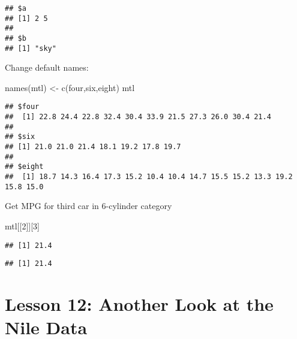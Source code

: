 \documentclass[
]{article}
\newenvironment{Shaded}{\begin{snugshade}}{\end{snugshade}}
\newcommand{\DecValTok}[1]{\textcolor[rgb]{0.00,0.00,0.81}{#1}}
\newcommand{\FunctionTok}[1]{\textcolor[rgb]{0.00,0.00,0.00}{#1}}
\newcommand{\NormalTok}[1]{#1}
\newcommand{\OtherTok}[1]{\textcolor[rgb]{0.56,0.35,0.01}{#1}}
\newcommand{\SpecialCharTok}[1]{\textcolor[rgb]{0.00,0.00,0.00}{#1}}
\newcommand{\StringTok}[1]{\textcolor[rgb]{0.31,0.60,0.02}{#1}}
\begin{document}
\begin{verbatim}
## $a
## [1] 2 5
## 
## $b
## [1] "sky"
\end{verbatim}

Change default names:

\begin{Shaded}
\begin{Highlighting}[]
\FunctionTok{names}\NormalTok{(mtl) }\OtherTok{\textless{}{-}} \FunctionTok{c}\NormalTok{(}\StringTok{\textquotesingle{}four\textquotesingle{}}\NormalTok{,}\StringTok{\textquotesingle{}six\textquotesingle{}}\NormalTok{,}\StringTok{\textquotesingle{}eight\textquotesingle{}}\NormalTok{)}
\NormalTok{mtl}
\end{Highlighting}
\end{Shaded}

\begin{verbatim}
## $four
##  [1] 22.8 24.4 22.8 32.4 30.4 33.9 21.5 27.3 26.0 30.4 21.4
## 
## $six
## [1] 21.0 21.0 21.4 18.1 19.2 17.8 19.7
## 
## $eight
##  [1] 18.7 14.3 16.4 17.3 15.2 10.4 10.4 14.7 15.5 15.2 13.3 19.2 15.8 15.0
\end{verbatim}

Get MPG for third car in 6-cylinder category

\begin{Shaded}
\begin{Highlighting}[]
\NormalTok{mtl[[}\DecValTok{2}\NormalTok{]][}\DecValTok{3}\NormalTok{]}
\end{Highlighting}
\end{Shaded}

\begin{verbatim}
## [1] 21.4
\end{verbatim}

\begin{Shaded}
\end{Shaded}

\begin{verbatim}
## [1] 21.4
\end{verbatim}

\hypertarget{lesson-12-another-look-at-the-nile-data}{%
\section{Lesson 12: Another Look at the Nile
Data}\label{lesson-12-another-look-at-the-nile-data}}
\end{document}
